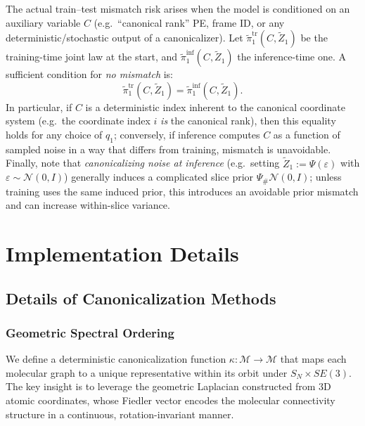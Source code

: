 \documentclass{article}
\theoremstyle{plain}
\theoremstyle{definition}
\theoremstyle{remark}
\newcommand{\1}{\mathbf{1}}
\begin{document}
The actual train--test mismatch risk arises when the model is conditioned on an auxiliary variable $C$ (e.g.\ ``canonical rank'' PE, frame ID,
or any deterministic/stochastic output of a canonicalizer). Let $\widetilde\pi^{\mathrm{tr}}_1(C,\widetilde Z_1)$ be the training-time joint
law at the start, and $\widetilde\pi^{\mathrm{inf}}_1(C,\widetilde Z_1)$ the inference-time one. A sufficient condition for \emph{no mismatch} is:
\begin{equation}
\widetilde\pi^{\mathrm{tr}}_1(C,\widetilde Z_1)=\widetilde\pi^{\mathrm{inf}}_1(C,\widetilde Z_1).
\end{equation}
In particular, if $C$ is a deterministic index inherent to the canonical coordinate system (e.g.\ the coordinate index $i$ \emph{is} the canonical
rank), then this equality holds for any choice of $q_1$; conversely, if inference computes $C$ as a function of sampled noise in a way that differs
from training, mismatch is unavoidable. Finally, note that \emph{canonicalizing noise at inference} (e.g.\ setting $\widetilde Z_1:=\Psi(\varepsilon)$
with $\varepsilon\sim\mathcal N(0,I)$) generally induces a complicated slice prior $\Psi_{\#}\mathcal N(0,I)$; unless training uses the same induced
prior, this introduces an avoidable prior mismatch and can increase within-slice variance.


\section{Implementation Details}\label{sec_appendix:imple_details}

\subsection{Details of Canonicalization Methods}\label{subsec_appendix:canon}


\subsubsection{Geometric Spectral Ordering}

We define a deterministic canonicalization function $\kappa: \mathcal{M} \to \mathcal{M}$ that maps each molecular graph to a unique representative within its orbit under $S_N \times SE(3)$. The key insight is to leverage the geometric Laplacian constructed from 3D atomic coordinates, whose Fiedler vector encodes the molecular connectivity structure in a continuous, rotation-invariant manner.
\end{document}
